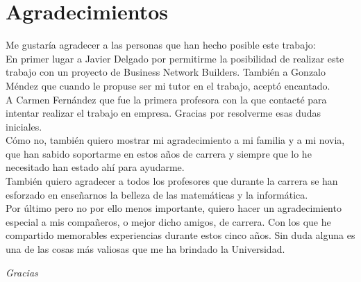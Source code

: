 \chapter*{Agradecimientos}
	Me gustaría agradecer a las personas que han hecho posible este trabajo:\\
	
	En primer lugar a Javier Delgado por permitirme la posibilidad de realizar este trabajo con un proyecto de Business Network Builders.
	También a Gonzalo Méndez que cuando le propuse ser mi tutor en el trabajo, aceptó encantado.\\

	A Carmen Fernández que fue la primera profesora con la que contacté para intentar realizar el trabajo en empresa.
	Gracias por resolverme esas dudas iniciales.\\
	
	Cómo no, también quiero mostrar mi agradecimiento a mi familia y a mi novia, 
	que han sabido soportarme en estos años de carrera y siempre que lo he necesitado han estado ahí para ayudarme.\\
	
	También quiero agradecer a todos los profesores que durante la carrera se han esforzado en enseñarnos la belleza de las matemáticas y la informática.\\
	
	Por último pero no por ello menos importante, quiero hacer un agradecimiento especial a mis compañeros, o mejor dicho amigos, de carrera.
	Con los que he compartido memorables experiencias durante estos cinco años. Sin duda alguna es una de las cosas más valiosas que me ha brindado la Universidad.\\
	
	
	\begin{center}
		\textit{Gracias}
	\end{center}
	
	
	
	

		
